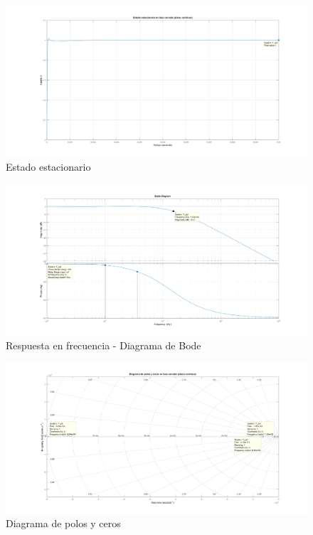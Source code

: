 \documentclass[12pt]{report}
\begin{document}
	\begin{figure}
		\centering
		\includegraphics[width=\textwidth,height=\textheight,keepaspectratio]{buck_steady_state} 
		\caption{Estado estacionario}
		\label{buck:steady_state}
	\end{figure}
	
	\begin{figure}
		\centering
		\includegraphics[width=\textwidth,height=\textheight,keepaspectratio]{buck_bode} 
		\caption{Respuesta en frecuencia - Diagrama de Bode}
		\label{buck:bode}
	\end{figure}
	
	\begin{figure}
		\centering
		\includegraphics[width=\textwidth,height=\textheight,keepaspectratio]{buck_polos_ceros} 
		\caption{Diagrama de polos y ceros}
		\label{buck:polos_ceros}
	\end{figure}
\end{document}
